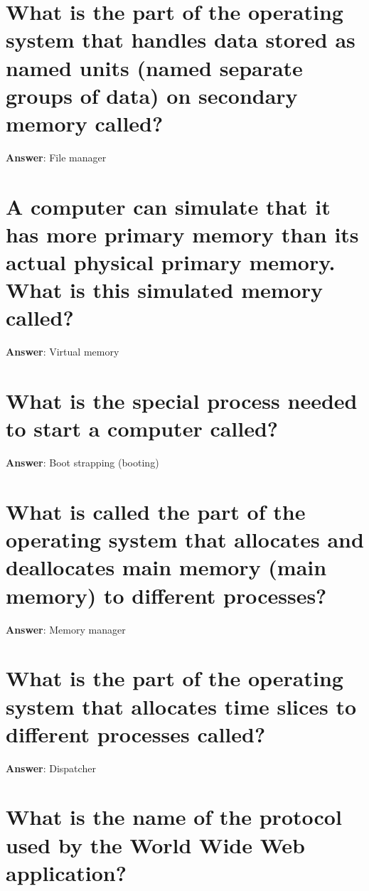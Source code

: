 \documentclass[a4paper,11pt,oneside]{book}
\begin{document}
\begin{sloppypar}
\section{What is the part of the operating system that handles data stored as named units (named separate groups of data) on secondary memory called?}

\label{q:13:sa:en:True}

\textbf{Answer}: File manager



\section{A computer can simulate that it has more primary memory than its actual physical primary memory. What is this simulated memory called?}

\label{q:14:sa:en:True}

\textbf{Answer}: Virtual memory



\section{What is the special process needed to start a computer called?}

\label{q:15:sa:en:True}

\textbf{Answer}: Boot strapping (booting)



\section{What is called the part of the operating system that allocates and deallocates main memory (main memory) to different processes?}

\label{q:16:sa:en:True}

\textbf{Answer}: Memory manager



\section{What is the part of the operating system that allocates time slices to different processes called?}

\label{q:17:sa:en:True}

\textbf{Answer}: Dispatcher



\section{What is the name of the protocol used by the World Wide Web application?}


\end{sloppypar}
\end{document}
